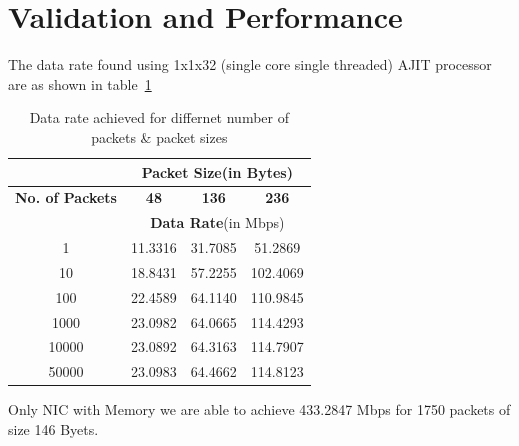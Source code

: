 \documentclass[12pt]{report}
\begin{document}
	\section{Validation and Performance}
		The data rate found using 1x1x32 (single core single threaded) AJIT processor are as shown in table~\ref{table_dataRate}
		\begin{table}[htbp]
			\caption{Data rate achieved for differnet number of packets \& packet sizes}
			\begin{center}
				\begin{tabular}{|c|c|c|c|}
					\hline
					& \multicolumn{3}{c|}{\textbf{Packet Size}(in Bytes)}\\
					\hline
					\textbf{No. of Packets}& \textbf{48}			& \textbf{136}			& \textbf{236} 	  \\
					\hline
					&  \multicolumn{3}{c|}{\textbf{Data Rate}(in Mbps)}\\	
					\hline
					1			& 11.3316		  	& 31.7085			& 51.2869 \\
					\hline
					10			& 18.8431		  	& 57.2255			& 102.4069\\
					\hline
					100			& 22.4589		  	& 64.1140			& 110.9845\\
					\hline
					1000			& 23.0982			& 64.0665			& 114.4293\\
					\hline
					10000			& 23.0892			& 64.3163			& 114.7907\\
					\hline
					50000			& 23.0983			& 64.4662			& 114.8123\\
					\hline
				\end{tabular}
				\label{table_dataRate}
			\end{center}
		\end{table}
	
	Only NIC with Memory we are able to achieve 433.2847 Mbps for 1750 packets of size 146 Byets.
\end{document}
